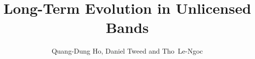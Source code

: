 \documentclass[graybox,envcountchap,sectrefs]{svmono}
\begin{document}
\author{Quang-Dung Ho, Daniel Tweed and \mbox{Tho Le-Ngoc}}
\title{Long-Term Evolution in Unlicensed Bands}
\maketitle

\frontmatter%


%


%
\tableofcontents
%


\mainmatter%
%








%

%
%

\end{document}
